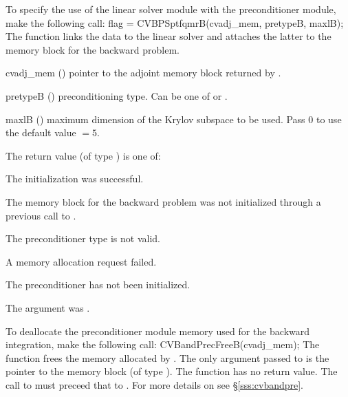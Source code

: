 {}
To specify the use of the {\cvsptfqmr} linear solver module with the {\cvbandpre} 
preconditioner module, make the following call:
{
  flag = CVBPSptfqmrB(cvadj\_mem, pretypeB, maxlB);
}
{
  The function  links the {\cvbandpre} data to the
  {\cvsptfqmr} linear solver and attaches the latter to the {\cvodes}
  memory block for the backward problem.
}
{
  \begin{args}
  \item[cvadj\_mem] ()
    pointer to the adjoint memory block returned by .
  \item[pretypeB] ()
    preconditioning type. Can be one of  or .
  \item[maxlB] ()
    maximum dimension of the Krylov subspace to be used. Pass $0$ to use the 
    default value $=5$.
  \end{args}
}
{
  The return value  (of type ) is one of:
  \begin{args}
  \item[\Id{CVBANDPRE\_ADJMEM\_NULL}]
    The {\cvsptfqmr} initialization was successful.
  \item[\Id{CVSPTFQMR\_MEM\_NULL}]
    The {\cvodes} memory block for the backward problem was not initialized through a 
    previous call to .
  \item[\Id{CVSPTFQMR\_ILL\_INPUT}]
    The preconditioner type  is not valid.
  \item[\Id{CVSPTFQMR\_MEM\_FAIL}]
    A memory allocation request failed.
  \item[\Id{CVBANDPRE\_PDATA\_NULL}]
    The {\cvbandpre} preconditioner has not been initialized.
  \item[\Id{CVBANDPRE\_ADJMEM\_NULL}]
    The  argument was .
  \end{args}
}
{}
To deallocate the {\cvbandpre} preconditioner module memory used for the
backward integration, make the following call:
{
  CVBandPrecFreeB(cvadj\_mem);
}
{
  The function  frees the memory allocated by
  .
}
{
  The only argument passed to  is the pointer to the {\cvodea} 
  memory block (of type ).
}
{
  The function  has no return value.
}
{
  The call to  must preceed that to .
}
For more details on {\cvbandpre} see \S\ref{sss:cvbandpre}.

